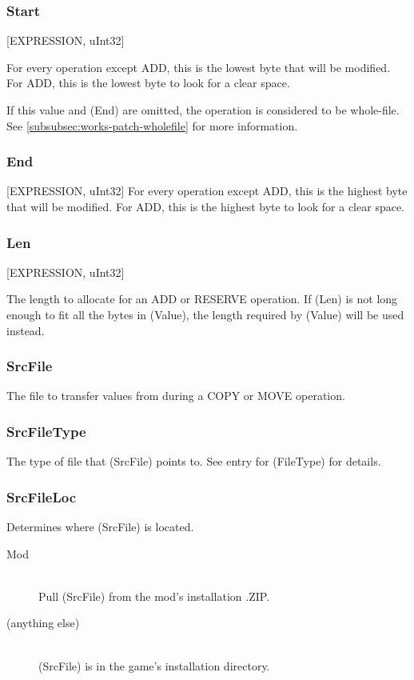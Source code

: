 \documentclass[12pt,a4paper,notitlepage]{article}
\begin{document}
\subsubsection{Start}
[EXPRESSION, uInt32]

For every operation except ADD, this is the lowest byte that will be modified. For ADD, this is the lowest byte to look for a clear space.

If this value and (End) are omitted, the operation is considered to be whole-file. See \ref{subsubsec:works-patch-wholefile} for more information.

\subsubsection{End}
[EXPRESSION, uInt32]
For every operation except ADD, this is the highest byte that will be modified. For ADD, this is the highest byte to look for a clear space.

\subsubsection{Len}
[EXPRESSION, uInt32]

The length to allocate for an ADD or RESERVE operation. If (Len) is not long enough to fit all the bytes in (Value), the length required by (Value) will be used instead. 

\subsubsection{SrcFile}
The file to transfer values from during a COPY or MOVE operation.

\subsubsection{SrcFileType}
The type of file that (SrcFile) points to. See entry for (FileType) for details.

\subsubsection{SrcFileLoc}
Determines where (SrcFile) is located.

\begin{description}
\item[Mod] \hfill \\ 
    Pull (SrcFile) from the mod's installation .ZIP.
\item[(anything else)] \hfill \\
    (SrcFile) is in the game's installation directory.
\end{description}
\end{document}
